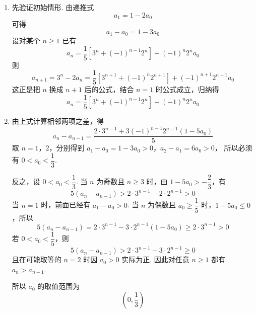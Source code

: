 \begin{solution}
\begin{enumerate}
\item 先验证初始情形. 由递推式
\[
a_1=1-2a_0
\]
可得
\[
a_1-a_0=1-3a_0
\]
设对某个 \(n\geqslant1\) 已有
\[
a_n=\frac15\left[3^n+(-1)^{n-1}2^n\right]+(-1)^n2^na_0
\]
则
\[
a_{n+1}=3^n-2a_n=\frac15\left[3^{n+1}+(-1)^n2^{n+1}\right]+(-1)^{n+1}2^{n+1}a_0
\]
这正是把 \(n\) 换成 \(n+1\) 后的公式，结合 \(n=1\) 时公式成立，归纳得
\[
a_n=\frac15\left[3^n+(-1)^{n-1}2^n\right]+(-1)^n2^na_0
\]

\item 由上式计算相邻两项之差，得
\[
a_n-a_{n-1}=\frac{2\cdot3^{n-1}+3(-1)^{n-1}2^{n-1}(1-5a_0)}5
\]
取 \(n=1\)，\(2\)，分别得到
\(a_1-a_0=1-3a_0>0\)，\(a_2-a_1=6a_0>0\)，
所以必须有 \(0<a_0<\dfrac13\).

反之，设 \(0<a_0<\dfrac13\). 当 \(n\) 为奇数且 \(n\geqslant3\) 时，由 \(1-5a_0>-\dfrac23\)，有
\[
5(a_n-a_{n-1})>2\cdot3^{n-1}-2\cdot2^{n-1}>0
\]
当 \(n=1\) 时，前面已经有 \(a_1-a_0>0\). 当 \(n\) 为偶数且 \(a_0\geqslant\dfrac15\) 时，\(1-5a_0\leqslant0\)，所以
\[
5(a_n-a_{n-1})=2\cdot3^{n-1}-3\cdot2^{n-1}(1-5a_0)\geqslant2\cdot3^{n-1}>0
\]
若 \(0<a_0<\dfrac15\)，则
\[
5(a_n-a_{n-1})>2\cdot3^{n-1}-3\cdot2^{n-1}\geqslant0
\]
且在可能取等的 \(n=2\) 时因 \(a_0>0\) 实际为正. 因此对任意 \(n\geqslant1\) 都有 \(a_n>a_{n-1}\).

所以 \(a_0\) 的取值范围为
\[
\left(0,\frac13\right)
\]
\end{enumerate}
\end{solution}
